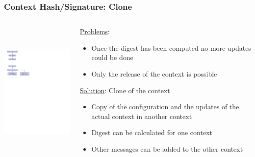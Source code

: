 \begin{frame}

\frametitle{Context Hash/Signature: Clone}

\begin{columns}



\begin{column}{0.4\textwidth}

\includegraphics[trim=1cm 17cm 13cm 0cm,
height=7cm]{figures/hash_signature_clone.pdf} 

\end{column}

\begin{column}{0.5\textwidth}


\underline{Problems}:
\begin{itemize}
  \item \footnotesize{Once the digest has been computed no more updates could be done}
  \item \footnotesize{Only the release of the context is possible}
\end{itemize}

\vspace{0.25cm}

\underline{Solution}: Clone of the context
\begin{itemize}
  \item \footnotesize{Copy of the configuration and the updates of the actual context
  in another context}
  \item \footnotesize{Digest can be calculated for one context}
  \item \footnotesize{Other messages can be added to the other context}
\end{itemize}


\end{column}

\end{columns}

\end{frame}